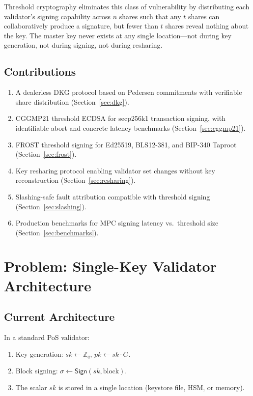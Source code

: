 \documentclass[11pt,a4paper]{article}
\begin{document}
Threshold cryptography eliminates this class of vulnerability by distributing each
validator's signing capability across $n$ shares such that any $t$ shares can
collaboratively produce a signature, but fewer than $t$ shares reveal nothing about
the key. The master key never exists at any single location---not during key
generation, not during signing, not during resharing.

\subsection{Contributions}

\begin{enumerate}[leftmargin=2em]
  \item A dealerless DKG protocol based on Pedersen commitments with verifiable
        share distribution (Section~\ref{sec:dkg}).
  \item CGGMP21 threshold ECDSA for secp256k1 transaction signing, with identifiable
        abort and concrete latency benchmarks (Section~\ref{sec:cggmp21}).
  \item FROST threshold signing for Ed25519, BLS12-381, and BIP-340 Taproot
        (Section~\ref{sec:frost}).
  \item Key resharing protocol enabling validator set changes without key
        reconstruction (Section~\ref{sec:resharing}).
  \item Slashing-safe fault attribution compatible with threshold signing
        (Section~\ref{sec:slashing}).
  \item Production benchmarks for MPC signing latency vs.\ threshold size
        (Section~\ref{sec:benchmarks}).
\end{enumerate}

\section{Problem: Single-Key Validator Architecture}
\label{sec:problem}

\subsection{Current Architecture}

In a standard PoS validator:

\begin{enumerate}[leftmargin=2em]
  \item Key generation: $sk \leftarrow \mathbb{Z}_q$, $pk \leftarrow sk \cdot G$.
  \item Block signing: $\sigma \leftarrow \textsf{Sign}(sk, \text{block})$.
  \item The scalar $sk$ is stored in a single location (keystore file, HSM, or memory).
\end{enumerate}
\end{document}
